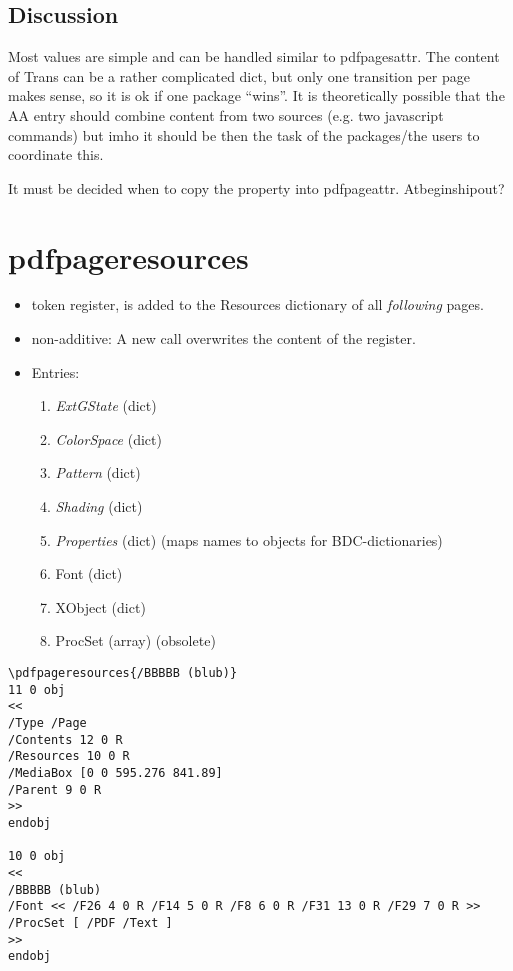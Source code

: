 \documentclass{article}
\begin{document}
\subsection{Discussion}

Most values are simple and can be handled similar to pdfpagesattr. The content of Trans can be a rather complicated dict, but only one transition per page makes sense, so it is ok if one package \enquote{wins}. It is theoretically possible that the AA entry should combine content from two sources (e.g. two javascript commands) but imho it should be then the task of the packages/the users to coordinate this.

It must be decided when to copy the property into pdfpageattr. Atbeginshipout?

\section{pdfpageresources}
\begin{itemize}
\item token register, is added to the Resources dictionary of all \emph{following} pages.
\item non-additive: A new call overwrites the content of the register.
\item Entries:
 \begin{enumerate}
 \item \emph{ExtGState} (dict)
 \item \emph{ColorSpace} (dict)
 \item \emph{Pattern} (dict)
 \item \emph{Shading} (dict)
 \item \emph{Properties} (dict) (maps names to objects for BDC-dictionaries)
 \item Font (dict)
 \item XObject (dict)
 \item ProcSet (array) (obsolete)
 \end{enumerate}

\end{itemize}
\begin{verbatim}
\pdfpageresources{/BBBBB (blub)}
11 0 obj
<<
/Type /Page
/Contents 12 0 R
/Resources 10 0 R
/MediaBox [0 0 595.276 841.89]
/Parent 9 0 R
>>
endobj

10 0 obj
<<
/BBBBB (blub)
/Font << /F26 4 0 R /F14 5 0 R /F8 6 0 R /F31 13 0 R /F29 7 0 R >>
/ProcSet [ /PDF /Text ]
>>
endobj
\end{verbatim}
\end{document}
